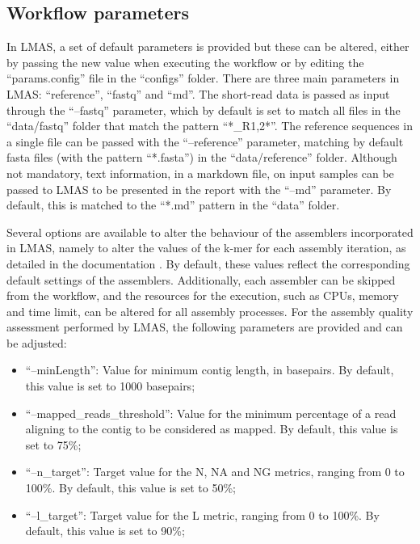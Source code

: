 \subsection{Workflow parameters}

In LMAS, a set of default parameters is provided but these can be altered, either by passing the new value when executing the workflow or by editing the “params.config” file in the “configs” folder. There are three main parameters in LMAS: “reference”, “fastq” and “md”. The short-read data is passed as input through the “--fastq” parameter, which by default is set to match all files in the “data/fastq” folder that match the pattern “*\_R{1,2}*”. The reference sequences in a single file can be passed with the “--reference” parameter, matching by default fasta files (with the pattern “*.fasta”) in the “data/reference” folder. Although not mandatory, text information, in a markdown file, on input samples can be passed to LMAS to be presented in the report with the “--md” parameter. By default, this is matched to the “*.md” pattern in the “data” folder.  

Several options are available to alter the behaviour of the assemblers incorporated in LMAS, namely to alter the values of the k-mer for each assembly iteration, as detailed in the documentation \cite{}. By default, these values reflect the corresponding default settings of the assemblers. Additionally, each assembler can be skipped from the workflow, and the resources for the execution, such as CPUs, memory and time limit, can be altered for all assembly processes. For the assembly quality assessment performed by LMAS, the following parameters are provided and can be adjusted: 

\begin{itemize}
    \item “--minLength”: Value for minimum contig length, in basepairs. By default, this value is set to 1000 basepairs;
    \item “--mapped\_reads\_threshold”: Value for the minimum percentage of a read aligning to the contig to be considered as mapped. By default, this value is set to 75\%;
    \item “--n\_target”: Target value for the N, NA and NG metrics, ranging from 0 to 100\%. By default, this value is set to 50\%;
    \item “--l\_target”: Target value for the L metric, ranging from 0 to 100\%. By default, this value is set to 90\%;
\end{itemize}

